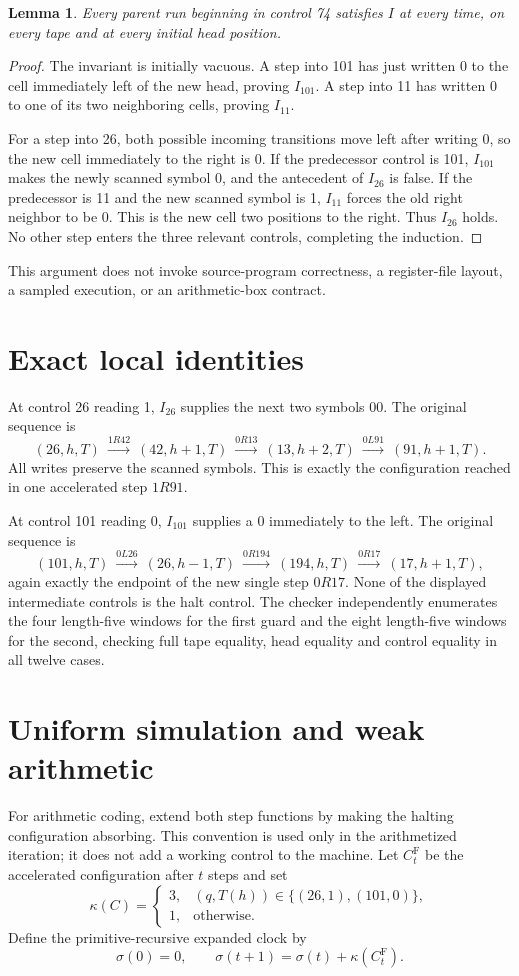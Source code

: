 \documentclass[11pt]{article}
\newtheorem{lemma}[theorem]{Lemma}
\begin{document}
\begin{lemma}
Every parent run beginning in control 74 satisfies $I$ at every time,
on every tape and at every initial head position.
\end{lemma}
\begin{proof}
The invariant is initially vacuous. A step into 101 has just written 0 to
the cell immediately left of the new head, proving $I_{101}$. A step into 11
has written 0 to one of its two neighboring cells, proving $I_{11}$.

For a step into 26, both possible incoming transitions move left after
writing 0, so the new cell immediately to the right is 0. If the predecessor
control is 101, $I_{101}$ makes the newly scanned symbol 0, and the antecedent
of $I_{26}$ is false. If the predecessor is 11 and the new scanned symbol is 1,
$I_{11}$ forces the old right neighbor to be 0. This is the new cell two
positions to the right. Thus $I_{26}$ holds. No other step enters the three
relevant controls, completing the induction.
\end{proof}

This argument does not invoke source-program correctness, a register-file
layout, a sampled execution, or an arithmetic-box contract.

\section{Exact local identities}
At control 26 reading 1, $I_{26}$ supplies the next two symbols $00$.
The original sequence is
\[
 (26,h,T)\ \xrightarrow{1R42}\ (42,h+1,T)
 \ \xrightarrow{0R13}\ (13,h+2,T)
 \ \xrightarrow{0L91}\ (91,h+1,T).
\]
All writes preserve the scanned symbols. This is exactly the configuration
reached in one accelerated step $1R91$.

At control 101 reading 0, $I_{101}$ supplies a 0 immediately to the left.
The original sequence is
\[
 (101,h,T)\ \xrightarrow{0L26}\ (26,h-1,T)
 \ \xrightarrow{0R194}\ (194,h,T)
 \ \xrightarrow{0R17}\ (17,h+1,T),
\]
again exactly the endpoint of the new single step $0R17$.
None of the displayed intermediate controls is the halt control.
The checker independently enumerates the four length-five windows for the
first guard and the eight length-five windows for the second, checking full
tape equality, head equality and control equality in all twelve cases.

\section{Uniform simulation and weak arithmetic}
For arithmetic coding, extend both step functions by making the halting
configuration absorbing. This convention is used only in the arithmetized
iteration; it does not add a working control to the machine.
Let $C_t^{\mathrm F}$ be the accelerated configuration after $t$ steps and set
\[
 \kappa(C)=\begin{cases}
 3,&(q,T(h))\in\{(26,1),(101,0)\},\\
 1,&\text{otherwise}.
 \end{cases}
\]
Define the primitive-recursive expanded clock by
\[
 \sigma(0)=0,\qquad
 \sigma(t+1)=\sigma(t)+\kappa(C_t^{\mathrm F}).
\]
\end{document}
